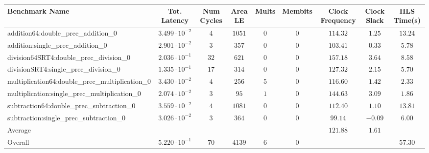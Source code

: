 \begin{tabular}{|l|c|c|c|c|c|c|c|c|}
\hline
Benchmark Name                                   & Tot. Latency            & Num Cycles & Area LE  & Mults & Membits & Clock Frequency & Clock Slack & HLS Time(s) \\
\hline
addition64:double\_prec\_addition\_0             & $ 3.499 \cdot 10^{-2} $ & $ 4      $ & $ 1051 $ & $ 0 $ & $ 0   $ & $ 114.32      $ & $ 1.25    $ & $ 13.24   $ \\
addition:single\_prec\_addition\_0               & $ 2.901 \cdot 10^{-2} $ & $ 3      $ & $ 357  $ & $ 0 $ & $ 0   $ & $ 103.41      $ & $ 0.33    $ & $ 5.78    $ \\
division64SRT4:double\_prec\_division\_0         & $ 2.036 \cdot 10^{-1} $ & $ 32     $ & $ 621  $ & $ 0 $ & $ 0   $ & $ 157.18      $ & $ 3.64    $ & $ 8.58    $ \\
divisionSRT4:single\_prec\_division\_0           & $ 1.335 \cdot 10^{-1} $ & $ 17     $ & $ 314  $ & $ 0 $ & $ 0   $ & $ 127.32      $ & $ 2.15    $ & $ 5.70    $ \\
multiplication64:double\_prec\_multiplication\_0 & $ 3.430 \cdot 10^{-2} $ & $ 4      $ & $ 256  $ & $ 5 $ & $ 0   $ & $ 116.60      $ & $ 1.42    $ & $ 2.33    $ \\
multiplication:single\_prec\_multiplication\_0   & $ 2.074 \cdot 10^{-2} $ & $ 3      $ & $ 95   $ & $ 1 $ & $ 0   $ & $ 144.63      $ & $ 3.09    $ & $ 1.86    $ \\
subtraction64:double\_prec\_subtraction\_0       & $ 3.559 \cdot 10^{-2} $ & $ 4      $ & $ 1081 $ & $ 0 $ & $ 0   $ & $ 112.40      $ & $ 1.10    $ & $ 13.81   $ \\
subtraction:single\_prec\_subtraction\_0         & $ 3.026 \cdot 10^{-2} $ & $ 3      $ & $ 364  $ & $ 0 $ & $ 0   $ & $ 99.14       $ & $ -0.09   $ & $ 6.00    $ \\
\hline
Average                                          & $                     $ & $        $ & $      $ & $   $ & $     $ & $ 121.88      $ & $ 1.61    $ & $         $ \\
\hline
Overall                                          & $ 5.220 \cdot 10^{-1} $ & $ 70     $ & $ 4139 $ & $ 6 $ & $ 0   $ & $             $ & $         $ & $ 57.30   $ \\
\hline
\end{tabular}
